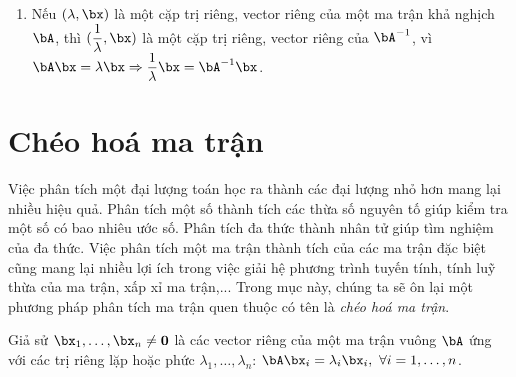 \begin{enumerate}
    \item Nếu $(\lambda, \bx)$ là một cặp trị riêng, vector riêng của một ma
    trận khả nghịch $\bA$, thì $\displaystyle(\frac{1}{\lambda}, \bx)$ là một
    cặp trị riêng, vector riêng của $\bA^{-1}$, vì $\displaystyle \bA\bx =
    \lambda\bx \Rightarrow \frac{1} {\lambda}\bx = \bA^{-1}\bx$.


\end{enumerate}




\section{Chéo hoá ma trận} %
\label{sec:cheo_hoa_ma_tran}

Việc phân tích một đại lượng toán học ra thành các đại lượng nhỏ hơn mang lại
nhiều hiệu quả. Phân tích một số thành tích các thừa số nguyên tố giúp kiểm tra
một số có bao nhiêu ước số. Phân tích đa thức thành nhân tử giúp tìm nghiệm của
đa thức. Việc phân tích một ma trận thành tích của các ma trận đặc biệt cũng mang lại nhiều lợi ích trong việc giải hệ phương trình tuyến tính,
tính luỹ thừa của ma trận, xấp xỉ ma trận,... Trong mục này, chúng ta sẽ ôn
lại một phương pháp phân tích ma trận quen thuộc có tên là \textit{chéo hoá ma
trận}.

Giả sử $\bx_1, \dots, \bx_n \neq \mathbf{0}$ là các vector riêng của một ma trận
vuông $\bA$ ứng với các trị riêng lặp hoặc phức $\lambda_1, \dots, \lambda_n$:
\begin{math}
    \bA\bx_i = \lambda_i \bx_i, ~\forall i = 1, \dots, n
\end{math}.

